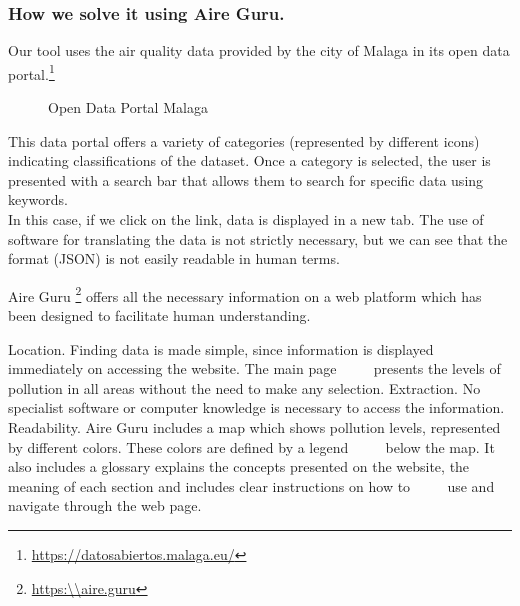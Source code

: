 \subsubsection{How we solve it using Aire Guru.} 

Our tool uses the air quality data provided by the city of Malaga in its open data portal.\footnote{\url{https://datosabiertos.malaga.eu/}}\\
\begin{figure}[ht]
    \centering
    \hfill




    \vfill
  
  \caption{Open Data Portal Malaga}
    \end{figure}

    This data portal offers a variety of categories (represented by different icons) indicating classifications of the dataset.
    Once a category is selected, the user is presented with a search bar that allows them to search for specific data using keywords.\\
    
    In this case, if we click on the link, data is displayed in a new tab. The use of software
    for translating the data is not strictly necessary, but we can see that the format (JSON) is not easily readable in human terms.

Aire Guru \footnote{\url{https:\\aire.guru}} offers all the necessary information on a web platform which has been designed to facilitate human understanding.


\begin{itemize}
    \done Location. Finding data is made simple, since information is displayed immediately on accessing the website. The main page
         presents the levels of pollution in all areas without the need to make any selection.
    \done Extraction. No specialist software or computer knowledge is necessary to access the information.
    \done Readability. Aire Guru includes a map which shows pollution levels, represented by different colors. These colors are defined by a legend
         below the map. It also includes a glossary explains the concepts presented on the website, the meaning of each section and includes clear instructions on how to
         use and navigate through the web page.
 

\end{itemize}
\newpage

 


